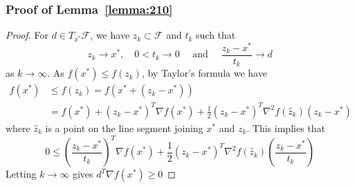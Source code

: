 \subsubsection{Proof of Lemma~\ref{lemma:210}}
\label{appendix:lemma210}
\begin{proof}
    For $d \in T_{x^{*}} \mathscr{F}$, we have ${z_k} \subset \mathscr{F}$ and ${t_k}$ such that
    $$
    z_{k} \rightarrow x^{*}, \quad 0<t_{k} \rightarrow 0 \quad \textrm { and } \quad \frac{z_{k}-x^{*}}{t_{k}} \rightarrow d
    $$
    as $k \rightarrow \infty$. As $f(x^*) \leq f(z_k)$, by Taylor’s formula we have
    $$
    \begin{aligned} f\left(x^{*}\right) & \leq f\left(z_{k}\right)=f\left(x^{*}+\left(z_{k}-x^{*}\right)\right) \\ &=f\left(x^{*}\right)+\left(z_{k}-x^{*}\right)^{T} \nabla f\left(x^{*}\right)+\frac{1}{2}\left(z_{k}-x^{*}\right)^{T} \nabla^{2} f\left(\hat{z}_{k}\right)\left(z_{k}-x^{*}\right) \end{aligned}
    $$
    where $\hat{z}_{k}$ is a point on the line segment joining $x^*$ and $z_k$. This implies that
    $$
    0 \leq\left(\frac{z_{k}-x^{*}}{t_{k}}\right)^{T} \nabla f\left(x^{*}\right)+\frac{1}{2}\left(z_{k}-x^{*}\right)^{T} \nabla^{2} f\left(\hat{z}_{k}\right)\left(\frac{z_{k}-x^{*}}{t_{k}}\right)
    $$
    Letting $k \rightarrow \infty$ gives $d^{T} \nabla f\left(x^{*}\right) \geq 0$
\end{proof}